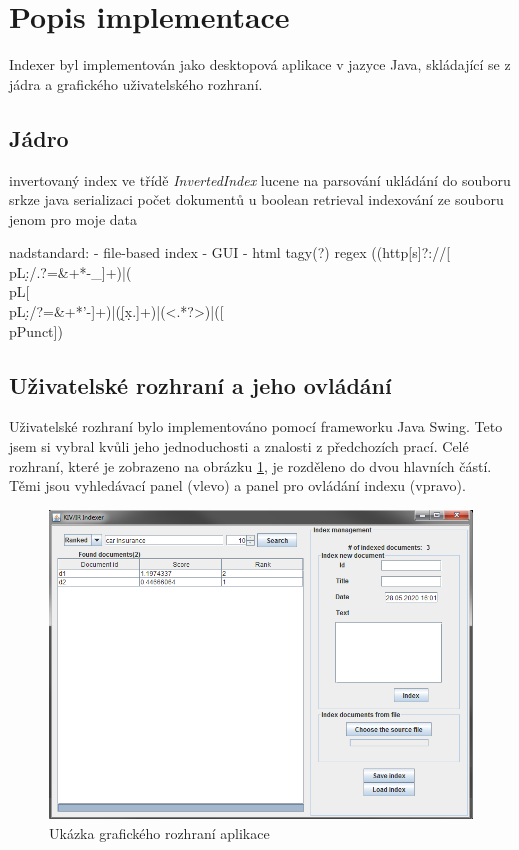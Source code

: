 \documentclass[11pt,a4paper]{scrartcl}
\begin{document}
	\section{Popis implementace}
	Indexer byl implementován jako desktopová aplikace v jazyce Java, skládající se z jádra a grafického uživatelského rozhraní.
	
	\subsection{Jádro}
	

	invertovaný index ve třídě \textit{InvertedIndex}
	lucene na parsování
	ukládání do souboru srkze java serializaci
	počet dokumentů u boolean retrieval
	indexování ze souboru jenom pro moje data
	
	nadstandard:
		- file-based index
		- GUI
		- html tagy(?) regex ((http[s]?://[\\p{L}\d:/.?=\&+*-\_]+)|(\\p{L}[\\p{L}\d:/?=\&+*'-]+)|(\d[\d*x.]+)|(<.*?>)|([\\p{Punct}])
	
	\subsection{Uživatelské rozhraní a jeho ovládání}
	
	Uživatelské rozhraní bylo implementováno pomocí frameworku Java Swing. Teto jsem si vybral kvůli jeho jednoduchosti a znalosti z předchozích prací. Celé rozhraní, které je zobrazeno na obrázku \ref{fig:gui-example}, je rozděleno do dvou hlavních částí. Těmi jsou vyhledávací panel (vlevo) a panel pro ovládání indexu (vpravo).
	
	\begin{figure}[!h]
		\centering
		\includegraphics[width=0.9\linewidth]{gui-ranked}
		\caption{Ukázka grafického rozhraní aplikace}
		\label{fig:gui-example}
	\end{figure}
\end{document}
